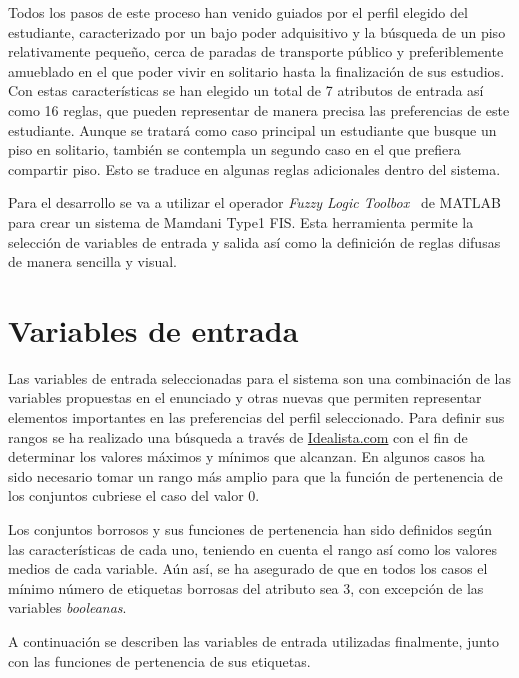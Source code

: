\documentclass[12pt]{report} %
\begin{document}
        Todos los pasos de este proceso han venido guiados por el perfil
        elegido del estudiante, caracterizado por un bajo poder adquisitivo y
        la búsqueda de un piso relativamente pequeño, cerca de paradas de
        transporte público y preferiblemente amueblado en el que poder vivir en
        solitario hasta la finalización de sus estudios. Con estas
        características se han elegido un total de 7 atributos de entrada así
        como 16 reglas, que pueden representar de manera precisa las
        preferencias de este estudiante. Aunque se tratará como caso principal
        un estudiante que busque un piso en solitario, también se contempla un
        segundo caso en el que prefiera compartir piso. Esto se traduce en
        algunas reglas adicionales dentro del sistema. 
        
        Para el desarrollo se va
        a utilizar el operador \textit{Fuzzy Logic Toolbox}~\cite{fuzzy-docs}
        de MATLAB para crear un sistema de Mamdani Type1 FIS. Esta herramienta
        permite la selección de variables de entrada y salida así como la
        definición de reglas difusas de manera sencilla y visual.

    \section{Variables de entrada}

        Las variables de entrada seleccionadas para el sistema son una
        combinación de las variables propuestas en el enunciado y otras nuevas
        que permiten representar elementos importantes en las preferencias del
        perfil seleccionado. Para definir sus rangos se ha realizado una
        búsqueda a través de \href{https://www.idealista.com/}{Idealista.com}
        con el fin de determinar los valores máximos y mínimos que alcanzan. En
        algunos casos ha sido necesario tomar un rango más amplio para que la
        función de pertenencia de los conjuntos cubriese el caso del valor 0.

        Los conjuntos borrosos y sus funciones de pertenencia han sido
        definidos según las características de cada uno, teniendo en cuenta el
        rango así como los valores medios de cada variable. Aún así, se ha
        asegurado de que en todos los casos el mínimo número de etiquetas borrosas del
        atributo sea 3, con excepción de las variables \textit{booleanas}.

        A continuación se describen las variables de entrada utilizadas finalmente, junto con las funciones de pertenencia de sus etiquetas. 
\end{document}
